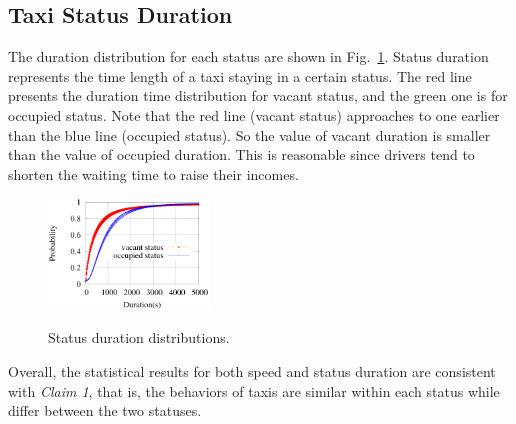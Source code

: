 \subsection{Taxi Status Duration}
The duration distribution for each status are shown in Fig.~\ref{figure_duration_for_each_status}. Status duration represents the time length of a taxi staying in a certain status. The red line presents the duration time distribution for vacant status, and the green one is for occupied status. Note that the red line (vacant status) approaches to  one earlier than the blue line (occupied status). So the value of vacant duration is smaller than the value of occupied duration. This is reasonable since drivers tend to shorten the waiting time to raise their incomes.
\begin{figure}[!h]
\centering
\includegraphics[width=0.38\textwidth]{figures_201103/assumption/durationdis.eps}\\
\caption{Status duration distributions.}\label{figure_duration_for_each_status}
\end{figure}

Overall, the statistical results for both speed and status duration are consistent with \emph{Claim 1}, that is, the behaviors of taxis are similar within each status while differ between the two statuses.
